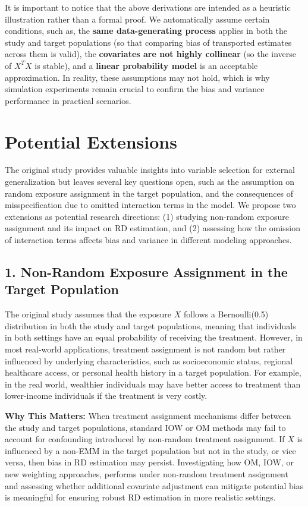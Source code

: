 \documentclass[12pt,oneside]{amsart}
\theoremstyle{definition}
\theoremstyle{remark}
\numberwithin{equation}{section}
\begin{document}
It is important to notice that the above derivations are intended as a heuristic illustration rather than a formal proof.  We automatically assume certain conditions, such as, the \textbf{same data-generating process} applies in both the study and target populations (so that comparing bias of transported estimates across them is valid), the \textbf{covariates are not highly collinear} (so the inverse of $X^TX$ is stable), and  a \textbf{linear probability model} is an acceptable approximation. In reality, these assumptions may not hold, which is why simulation experiments remain crucial to confirm the bias and variance performance in practical scenarios.

\section{Potential Extensions}
The original study provides valuable insights into variable selection for external generalization but leaves several key questions open, such as the assumption on random exposure assignment in the target population, and the consequences of misspecification due to omitted interaction terms in the model. We propose two extensions as potential research directions: (1) studying non-random exposure assignment and its impact on RD estimation, and (2) assessing how the omission of interaction terms affects bias and variance in different modeling approaches.

\subsection{1. Non-Random Exposure Assignment in the Target Population}

The original study assumes that the exposure \( X \) follows a Bernoulli(0.5) distribution in both the study and target populations, meaning that individuals in both settings have an equal probability of receiving the treatment. However, in most real-world applications, treatment assignment is not random but rather influenced by underlying characteristics, such as socioeconomic status, regional healthcare access, or personal health history in a target population. For example, in the real world, wealthier individuals may have better access to treatment than lower-income individuals if the treatment is very costly.  

\textbf{Why This Matters:} When treatment assignment mechanisms differ between the study and target populations, standard IOW or OM methods may fail to account for confounding introduced by non-random treatment assignment. If \( X \) is influenced by a non-EMM  in the target population but not in the study, or vice versa, then bias in RD estimation may persist. Investigating how OM, IOW, or new weighting approaches, performs under non-random treatment assignment and assessing whether additional covariate adjustment can mitigate potential bias is meaningful for ensuring robust RD estimation in more realistic settings.
\end{document}
